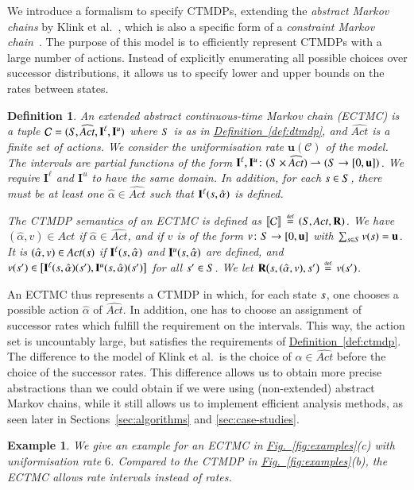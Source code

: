 \documentclass[10pt,twocolumn]{article}
\newtheorem{definition}{Definition}
\newtheorem{example}{Example}
\newcommand{\states} {{\ensuremath S}}
\newcommand{\state}  {{\ensuremath s}}
\newcommand{\acts}{\mathit{Act}}
\newcommand{\rmat}{\mathbf{R}}
\newcommand{\cmodel}{\mathcal{C}}
\newcommand{\urate}{\mathbf{u}}
\newcommand{\act}{\alpha}
\newcommand{\ivall}{{\mathbf{I}^{\ell}}}
\newcommand{\ivalu}{{\mathbf{I}^u}}
\newcommand{\refdef}[1]{\texorpdfstring{\hyperref[def:#1]{Definition~\ref*{def:#1}}}{Definition \ref*{def:#1}}}
\newcommand{\reffig}[1]{\texorpdfstring{\hyperref[fig:#1]{Fig.~\ref*{fig:#1}}}{Fig.~\ref*{fig:#1}}}
\newcommand{\defeq}{\,\stackrel{\mbox{\rm {\tiny def}}}{=}\,}
\newcommand{\partialto}{\rightharpoonup}
\newcommand{\sem}[1]{\ensuremath{\llbracket #1 \rrbracket}\xspace}
\begin{document}
We introduce a formalism to specify CTMDPs, extending the \emph{abstract Markov chains} by Klink et al.~\cite{Klink10,KatoenKLW07,KozineU02}, which is also a specific form of a \emph{constraint Markov chain}~\cite{CaillaudDLLPW10}.
The purpose of this model is to efficiently represent CTMDPs with a large number of actions.
Instead of explicitly enumerating all possible choices over successor distributions, it allows us to specify lower and upper bounds on the rates between states.
\begin{definition}
  \label{def:imc}
An \emph{extended abstract continuous-time Markov chain (ECTMC)} is a tuple 
  $\cmodel = (\states, \widehat{\acts}, \ivall, \ivalu)$ where $\states$ is 
  as in \refdef{dtmdp}, and $\widehat{\acts}$ is a finite set of actions.
  We consider the uniformisation rate $\urate(\cmodel)$ of the model.
  The \emph{intervals} are partial functions of the form 
  $\ivall, \ivalu\colon (\states \times \widehat{\acts}) \partialto (\states \to [0,\urate])$.
  We require $\ivall$ and $\ivalu$ to have the same domain.
  In addition, for each $\state \in \states$, there must be at least 
  one $\hat{\act}\in\widehat{\acts}$ such that $\ivall(\state, \hat{\act})$ is defined.

  The \emph{CTMDP semantics} of an ECTMC is defined as $\sem{\cmodel} \defeq (\states, \acts, \rmat)$.
  We have $(\hat{\act},v) \in \acts$ if $\hat{\act} \in \widehat{\acts}$, and if $v$ is of the form $v\colon \states \to [0,\urate]$ with $\sum_{\state \in \states} v(\state) = \urate$.
  It is $(\hat{\act}, v) \in \acts(\state)$ if $\ivall(\state, \hat{\act})$ and $\ivalu(\state,\hat{\act})$ are defined,
  and $v(\state') \in \bigl[\ivall(\state, \hat{\act})(\state'), \ivalu(\state, \hat{\act})(\state')\bigr]$ for all $\state' \in \states$.
  We let $\rmat\bigl(\state, (\hat{\act}, v), \state'\bigr) \defeq v(\state')$.
\end{definition}
An ECTMC thus represents a CTMDP in which, for each state $\state$, one chooses a possible action $\hat{\act}$ of $\widehat{\acts}$.
In addition, one has to choose an assignment of successor rates which fulfill the requirement on the intervals.
This way, the action set is uncountably large, but satisfies the requirements of \refdef{ctmdp}.
The difference to the model of Klink et al.~is the choice of $\hat{\act} \in \widehat{\acts}$ before the choice of the successor rates.
This difference allows us to obtain more precise abstractions than we could obtain if we were using (non-extended) abstract Markov chains, while 
it still allows us to implement efficient analysis methods, as seen later in Sections~\ref{sec:algorithms} and \ref{sec:case-studies}.
\begin{example}
  \label{exa:ectmc}
We give an example for an ECTMC in \reffig{examples}(c) with uniformisation rate $6$. Compared to the
  CTMDP in \reffig{examples}(b), the ECTMC allows rate intervals instead of rates.
\end{example}
\end{document}
